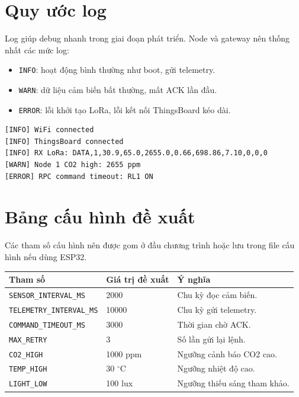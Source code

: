 \section{Quy ước log}
Log giúp debug nhanh trong giai đoạn phát triển. Node và gateway nên thống nhất các mức log:
\begin{itemize}
    \item \texttt{INFO}: hoạt động bình thường như boot, gửi telemetry.
    \item \texttt{WARN}: dữ liệu cảm biến bất thường, mất ACK lần đầu.
    \item \texttt{ERROR}: lỗi khởi tạo LoRa, lỗi kết nối ThingsBoard kéo dài.
\end{itemize}

\begin{lstlisting}[caption={Ví dụ log gateway}]
[INFO] WiFi connected
[INFO] ThingsBoard connected
[INFO] RX LoRa: DATA,1,30.9,65.0,2655.0,0.66,698.86,7.10,0,0,0
[WARN] Node 1 CO2 high: 2655 ppm
[ERROR] RPC command timeout: RL1 ON
\end{lstlisting}

\section{Bảng cấu hình đề xuất}
Các tham số cấu hình nên được gom ở đầu chương trình hoặc lưu trong file cấu hình nếu dùng ESP32.

\begin{longtable}{|p{4cm}|p{3cm}|p{6cm}|}
\hline
\textbf{Tham số} & \textbf{Giá trị đề xuất} & \textbf{Ý nghĩa} \\
\hline
\texttt{SENSOR\_INTERVAL\_MS} & 2000 & Chu kỳ đọc cảm biến. \\
\hline
\texttt{TELEMETRY\_INTERVAL\_MS} & 10000 & Chu kỳ gửi telemetry. \\
\hline
\texttt{COMMAND\_TIMEOUT\_MS} & 3000 & Thời gian chờ ACK. \\
\hline
\texttt{MAX\_RETRY} & 3 & Số lần gửi lại lệnh. \\
\hline
\texttt{CO2\_HIGH} & 1000 ppm & Ngưỡng cảnh báo CO2 cao. \\
\hline
\texttt{TEMP\_HIGH} & 30 $^\circ$C & Ngưỡng nhiệt độ cao. \\
\hline
\texttt{LIGHT\_LOW} & 100 lux & Ngưỡng thiếu sáng tham khảo. \\
\hline
\end{longtable}
